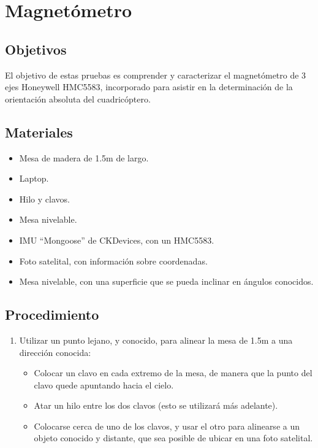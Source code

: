\documentclass[spanish,12pt,a4paper,titlepage]{report}
\begin{document}
\chapter{Magnetómetro}
\label{chap:magnetometro}

\section{Objetivos}

El objetivo de estas pruebas es comprender y caracterizar el magnetómetro de 3 ejes Honeywell HMC5583, incorporado para asistir en la determinación de la orientación absoluta del cuadricóptero.

\section{Materiales}
\label{sec:materiales}

\begin{itemize}
\item Mesa de madera de 1.5m de largo.
\item Laptop.
\item Hilo y clavos.
\item Mesa nivelable.
\item IMU ``Mongoose'' de CKDevices, con un HMC5583.
\item Foto satelital, con información sobre coordenadas.
\item Mesa nivelable, con una superficie que se pueda inclinar en ángulos conocidos.
\end{itemize}

\newpage
\section{Procedimiento}
\label{sec:procedimiento}

\begin{enumerate}
\item Utilizar un punto lejano, y conocido, para alinear la mesa de 1.5m a una dirección conocida:
  \begin{itemize}
  \item Colocar un clavo en cada extremo de la mesa, de manera que la punto del clavo quede apuntando hacia el cielo.
  \item Atar un hilo entre los dos clavos (esto se utilizará más adelante).
  \item Colocarse cerca de uno de los clavos, y usar el otro para alinearse a un objeto conocido y distante, que sea posible de ubicar en una foto satelital.
  \end{itemize}

\end{enumerate}
\end{document}
